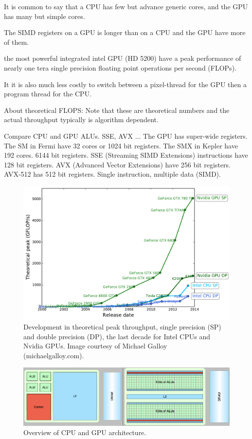 It is common to say that a CPU has few but advance generic cores, and the GPU has many but simple cores.

The SIMD registers on a GPU is longer than on a CPU and the GPU have more of them.

 the most powerful integrated intel GPU (HD 5200) have a peak performance of nearly one tera single precision floating point operations per second (FLOPs).

It it is also much less costly to switch between a pixel-thread for the GPU then a program thread for the CPU.  

About theoretical FLOPS: Note that these are theoretical numbers and the actual throughput typically is algorithm dependent.

Compare CPU and GPU ALUs. SSE, AVX ... The GPU has super-wide registers. The SM in Fermi have 32 cores or 1024 bit registers. The SMX in Kepler have 192 cores. 6144 bit registers. SSE (Streaming SIMD Extensions) instructions have 128 bit registers. AVX (Advanced Vector Extensions) have 256 bit registers. AVX-512 has 512 bit registers. Single instruction, multiple data (SIMD).

\begin{figure}
\centering
\includegraphics[width=\textwidth]{img/cpu_vs_gpu.pdf}
\caption{Development in theoretical peak throughput, single precision (SP) and double precision (DP), the last decade for Intel CPUs and Nvidia GPUs. Image courtesy of Michael Galloy (michaelgalloy.com).}
\label{fig:cpu_vs_gpu}
\end{figure}

\begin{figure}
\centering
\includegraphics[width=\textwidth]{img/CPU-GPU.png}
\caption{Overview of CPU and GPU architecture.}
\label{fig:cpu_gpu}
\end{figure}

